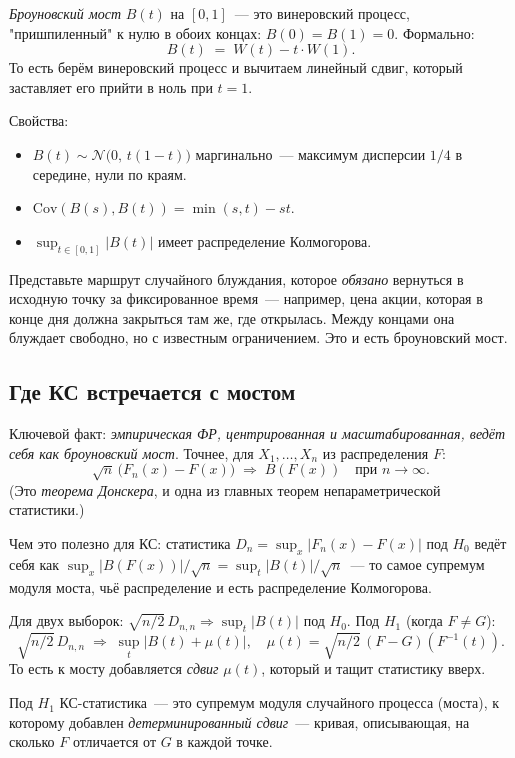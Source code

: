 \documentclass[11pt]{article}
\begin{document}
\emph{Броуновский мост} $B(t)$ на $[0, 1]$~--- это винеровский процесс, "пришпиленный" к нулю в обоих концах: $B(0) = B(1) = 0$. Формально:
\[
B(t) \;=\; W(t) - t\cdot W(1).
\]
То есть берём винеровский процесс и вычитаем линейный сдвиг, который заставляет его прийти в ноль при $t = 1$.

Свойства:
\begin{itemize}[leftmargin=2em, itemsep=1pt]
\item $B(t) \sim \mathcal{N}\bigl(0,\, t(1-t)\bigr)$ маргинально~--- максимум дисперсии $1/4$ в середине, нули по краям.
\item $\text{Cov}(B(s), B(t)) = \min(s, t) - st$.
\item $\sup_{t \in [0,1]} |B(t)|$ имеет распределение Колмогорова.
\end{itemize}

\begin{intuition}
Представьте маршрут случайного блуждания, которое \emph{обязано} вернуться в исходную точку за фиксированное время~--- например, цена акции, которая в конце дня должна закрыться там же, где открылась. Между концами она блуждает свободно, но с известным ограничением. Это и есть броуновский мост.
\end{intuition}

\subsection{Где КС встречается с мостом}

Ключевой факт: \emph{эмпирическая ФР, центрированная и масштабированная, ведёт себя как броуновский мост}. Точнее, для $X_1, \ldots, X_n$ из распределения $F$:
\[
\sqrt{n}\,\bigl(F_n(x) - F(x)\bigr) \;\Rightarrow\; B(F(x))
\quad \text{при } n \to \infty.
\]
(Это \emph{теорема Донскера}, и одна из главных теорем непараметрической статистики.)

Чем это полезно для КС: статистика $D_n = \sup_x |F_n(x) - F(x)|$ под $H_0$ ведёт себя как $\sup_x |B(F(x))|/\sqrt{n} = \sup_t |B(t)|/\sqrt{n}$~--- то самое супремум модуля моста, чьё распределение и есть распределение Колмогорова.

Для двух выборок: $\sqrt{n/2}\, D_{n,n} \Rightarrow \sup_t |B(t)|$ под $H_0$. Под $H_1$ (когда $F \neq G$):
\[
\sqrt{n/2}\, D_{n,n} \;\Rightarrow\; \sup_t \bigl|B(t) + \mu(t)\bigr|,
\quad \mu(t) = \sqrt{n/2}\,(F-G)(F^{-1}(t)).
\]
То есть к мосту добавляется \emph{сдвиг} $\mu(t)$, который и тащит статистику вверх.

\begin{tldr}
Под $H_1$ КС-статистика~--- это супремум модуля случайного процесса (моста), к которому добавлен \emph{детерминированный сдвиг}~--- кривая, описывающая, на сколько $F$ отличается от $G$ в каждой точке.
\end{tldr}
\end{document}
